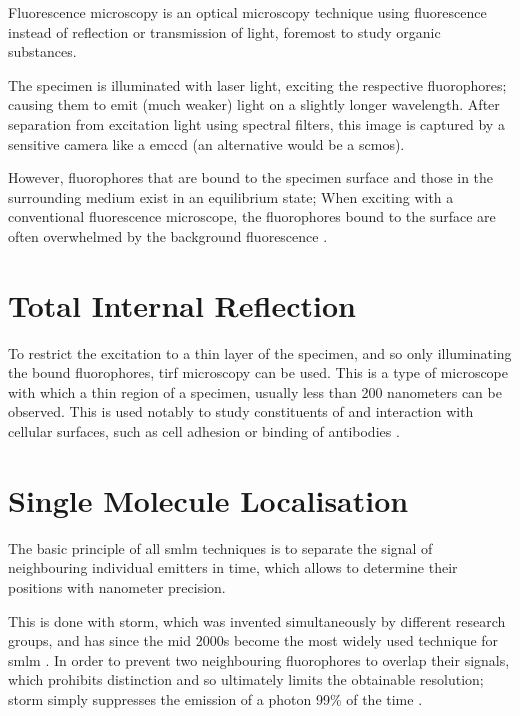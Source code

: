 \documentclass[11pt, a4paper, oneside, twocolumn]{report}
\renewcommand{\t}{\todo}
\newcommand{\x}[1]{#1\index{#1}}
\begin{document}
Fluorescence microscopy is an optical microscopy technique using
fluorescence instead of reflection or transmission of light, foremost
to study organic substances.

The specimen is illuminated with laser light, exciting the respective
\x{fluorophores}; causing them to emit (much weaker) light on a
slightly longer wavelength. After separation from excitation light
using spectral filters, this image is captured by a sensitive camera
like a \gls{emccd} (an alternative would be a \gls{scmos}).

However, fluorophores that are bound to the specimen surface and those
in the surrounding medium exist in an equilibrium state; When exciting
with a conventional fluorescence microscope, the fluorophores bound to
the surface are often overwhelmed by the background fluorescence
\t{ref}.

\t{rewrite}


\section{Total Internal Reflection}

To restrict the excitation to a thin layer of the specimen, and so
only illuminating the bound fluorophores, \gls{tirf} microscopy can be
used. This is a type of microscope with which a thin region of a
specimen, usually less than 200 nanometers can be observed. This is
used notably to study constituents of and interaction with cellular
surfaces, such as cell adhesion or binding of antibodies \t{ref}.


\section{Single Molecule Localisation}

The basic principle of all \gls{smlm} techniques is to separate the
signal of neighbouring individual emitters in time, which allows to
determine their positions with nanometer precision.

This is done with \gls{storm}, which was invented simultaneously by
different research groups, and has since the mid 2000s become the most
widely used technique for \gls{smlm} \t{ref}. In order to prevent two
neighbouring fluorophores to overlap their signals, which prohibits
distinction and so ultimately limits the obtainable resolution;
\gls{storm} simply suppresses the emission of a photon 99\% of the
time \t{explain}.
\end{document}
